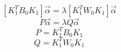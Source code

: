 \documentclass[preview]{standalone}
\begin{document}
\[
    [K_1^TB_0K_1]\vec{\alpha}=\lambda [K_1^TW_0K_1]\vec{\alpha}
\]
\[
    P\vec{\alpha}=\lambda Q\vec{\alpha}
\]
\[
    P=K_1^TB_0K_1
\]
\[
    Q=K_1^TW_0K_1
\]
\end{document}
